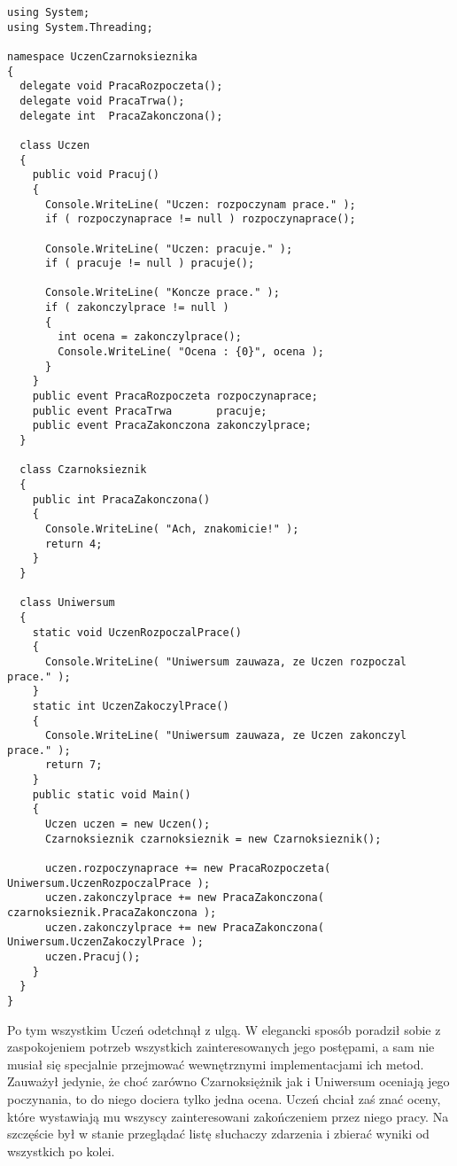 {\begin{scriptsize}
\begin{verbatim}
using System;
using System.Threading;

namespace UczenCzarnoksieznika
{	
  delegate void PracaRozpoczeta();
  delegate void PracaTrwa();
  delegate int  PracaZakonczona();
  
  class Uczen
  {
    public void Pracuj()
    {
      Console.WriteLine( "Uczen: rozpoczynam prace." );
      if ( rozpoczynaprace != null ) rozpoczynaprace();
  		
      Console.WriteLine( "Uczen: pracuje." );
      if ( pracuje != null ) pracuje();
  	  
      Console.WriteLine( "Koncze prace." );
      if ( zakonczylprace != null ) 
      {
        int ocena = zakonczylprace();
        Console.WriteLine( "Ocena : {0}", ocena );
      }
    }
    public event PracaRozpoczeta rozpoczynaprace;
    public event PracaTrwa       pracuje;
    public event PracaZakonczona zakonczylprace;
  }
  
  class Czarnoksieznik 
  {
    public int PracaZakonczona() 
    {
      Console.WriteLine( "Ach, znakomicie!" );
      return 4;
    }
  }
  
  class Uniwersum
  {  	
    static void UczenRozpoczalPrace()
    {
      Console.WriteLine( "Uniwersum zauwaza, ze Uczen rozpoczal prace." );      
    }
    static int UczenZakoczylPrace()
    {
      Console.WriteLine( "Uniwersum zauwaza, ze Uczen zakonczyl prace." );      
      return 7;
    }
    public static void Main()
    {
      Uczen uczen = new Uczen();
      Czarnoksieznik czarnoksieznik = new Czarnoksieznik();
  		
      uczen.rozpoczynaprace += new PracaRozpoczeta( Uniwersum.UczenRozpoczalPrace );    	
      uczen.zakonczylprace += new PracaZakonczona( czarnoksieznik.PracaZakonczona );  		
      uczen.zakonczylprace += new PracaZakonczona( Uniwersum.UczenZakoczylPrace );    	
      uczen.Pracuj();
    }
  }
}
\end{verbatim}
\end{scriptsize}

Po tym wszystkim Uczeń odetchnął z ulgą. W elegancki sposób poradził sobie z zaspokojeniem
potrzeb wszystkich zainteresowanych jego postępami, a sam nie musiał się specjalnie
przejmować wewnętrznymi implementacjami ich metod. Zauważył jedynie, że choć zarówno Czarnoksiężnik jak i 
Uniwersum oceniają jego poczynania, to do niego dociera tylko jedna ocena. Uczeń chciał zaś znać
oceny, które wystawiają mu wszyscy zainteresowani zakończeniem przez niego pracy. 
Na szczęście był w stanie przeglądać listę słuchaczy zdarzenia i zbierać wyniki od wszystkich
po kolei.

}
